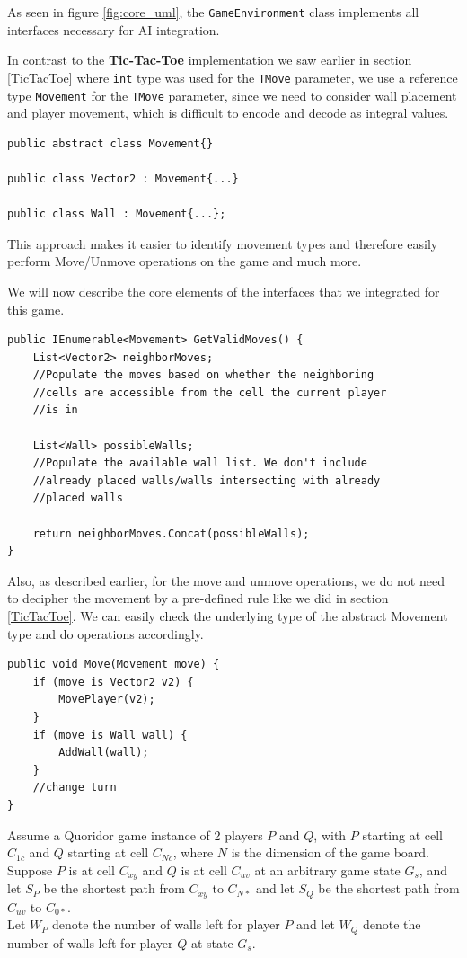 As seen in figure \ref{fig:core_uml}, the \texttt{GameEnvironment} class implements all interfaces necessary for \gls{AI} integration.

In contrast to the \textbf{Tic-Tac-Toe} implementation we saw earlier in section \ref{TicTacToe} where \texttt{int} type was used for the \texttt{TMove} parameter, we use a reference type \texttt{Movement} for the \texttt{TMove} parameter, since we need to consider wall placement and player movement, which is difficult to encode and decode as integral values.

\begin{lstlisting}
public abstract class Movement{}

public class Vector2 : Movement{...}

public class Wall : Movement{...};
\end{lstlisting}

This approach makes it easier to identify movement types and therefore easily perform Move/Unmove operations on the game and much more.

We will now describe the core elements of the interfaces that we integrated for this game.

\begin{lstlisting}
public IEnumerable<Movement> GetValidMoves() {
    List<Vector2> neighborMoves;
    //Populate the moves based on whether the neighboring
    //cells are accessible from the cell the current player
    //is in

    List<Wall> possibleWalls;
    //Populate the available wall list. We don't include
    //already placed walls/walls intersecting with already
    //placed walls

    return neighborMoves.Concat(possibleWalls);
}
\end{lstlisting}

Also, as described earlier, for the move and unmove operations, we do not need to decipher the movement by a pre-defined rule like we did in section \ref{TicTacToe}. We can easily check the underlying type of the abstract Movement type and do operations accordingly.

\begin{lstlisting}
public void Move(Movement move) {
    if (move is Vector2 v2) {
        MovePlayer(v2);
    }
    if (move is Wall wall) {
        AddWall(wall);
    }
    //change turn
}
\end{lstlisting}

Assume a Quoridor game instance of 2 players $P$ and $Q$, with $P$ starting at cell $C_{1c}$ and $Q$ starting at cell $C_{Nc}$, where $N$ is the dimension of the game board.\\
Suppose $P$ is at cell $C_{xy}$ and $Q$ is at cell $C_{uv}$ at an arbitrary game state $G_s$, and let $S_P$ be the shortest path from $C_{xy}$ to $C_{N*}$ and let $S_Q$ be the shortest path from $C_{uv}$ to $C_{0*}$.\\
Let $W_P$ denote the number of walls left for player $P$ and let $W_Q$ denote the number of walls left for player $Q$ at state $G_s$.


